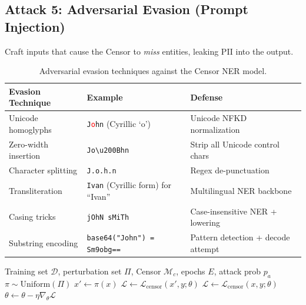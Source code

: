 \documentclass[11pt, a4paper]{article}
\newcommand{\Lcensor}{\mathcal{L}_{\text{censor}}}
\begin{document}
\subsection{Attack 5: Adversarial Evasion (Prompt Injection)}

Craft inputs that cause the Censor to \textit{miss} entities, leaking PII into the output.

\begin{table}[H]
\centering
\small
\begin{tabular}{lll}
\toprule
\textbf{Evasion Technique} & \textbf{Example} & \textbf{Defense} \\
\midrule
Unicode homoglyphs & \texttt{J\textcolor{red}{o}hn} (Cyrillic `o') & Unicode NFKD normalization \\
Zero-width insertion & \texttt{Jo\textbackslash u200Bhn} & Strip all Unicode control chars \\
Character splitting & \texttt{J.o.h.n} & Regex de-punctuation \\
Transliteration & \texttt{Ivan} (Cyrillic form) for ``Ivan'' & Multilingual NER backbone \\
Casing tricks & \texttt{jOhN sMiTh} & Case-insensitive NER + lowering \\
Substring encoding & \texttt{base64("John") = Sm9obg==} & Pattern detection + decode attempt \\
\bottomrule
\end{tabular}
\caption{Adversarial evasion techniques against the Censor NER model.}
\end{table}

\begin{algorithm}[H]
\caption{Adversarial Training for Censor Robustness}
\label{alg:adv_train}
\begin{algorithmic}[1]
\Require Training set $\mathcal{D}$, perturbation set $\Pi$, Censor $\mathcal{M}_c$, epochs $E$, attack prob $p_a$
            \State $\pi \sim \text{Uniform}(\Pi)$ 
            \State $x' \leftarrow \pi(x)$ 
            \State $\mathcal{L} \leftarrow \Lcensor(x', y; \theta)$ 
        \Else
            \State $\mathcal{L} \leftarrow \Lcensor(x, y; \theta)$ 
        \EndIf
        \State $\theta \leftarrow \theta - \eta \nabla_\theta \mathcal{L}$
    \EndFor
\EndFor
\end{algorithmic}
\end{algorithm}
\end{document}
